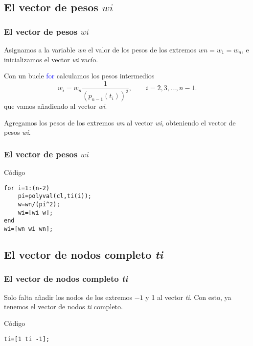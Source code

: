 \documentclass{beamer}
\begin{document}
\subsection{El vector de pesos $wi$}
\begin{frame}
\frametitle{El vector de pesos $wi$}
Asignamos a la variable \textit{wn} el valor de los pesos de los extremos $wn=w_1=w_n$, e inicializamos el vector \textit{wi} vacío.

Con un bucle \textcolor{blue}{for} calculamos los pesos intermedios 
\[
w_i=w_n\frac{1}{(p_{n-1}(t_i))^2},\qquad i=2,3,...,n-1.
\]
que vamos añadiendo al vector \textit{wi}.

Agregamos los pesos de los extremos \textit{wn} al vector \textit{wi}, obteniendo el vector de pesos \textit{wi}.
\end{frame}

\begin{frame}[fragile]
\frametitle{El vector de pesos $wi$}
\begin{exampleblock}{Código}
\begin{verbatim}
for i=1:(n-2)
    pi=polyval(cl,ti(i));
    w=wn/(pi^2);
    wi=[wi w];
end
wi=[wn wi wn];
\end{verbatim}
\end{exampleblock}
\end{frame}

\subsection{El vector de nodos completo \textit{ti}}
\begin{frame}[fragile]
\frametitle{El vector de nodos completo \textit{ti}}
Solo falta añadir los nodos de los extremos $-1$ y 1 al vector \textit{ti}. Con esto, ya tenemos el vector de nodos \textit{ti} completo.

\begin{exampleblock}{Código}
\begin{verbatim}
ti=[1 ti -1];
\end{verbatim}
\end{exampleblock}
\end{frame}

\end{document}
